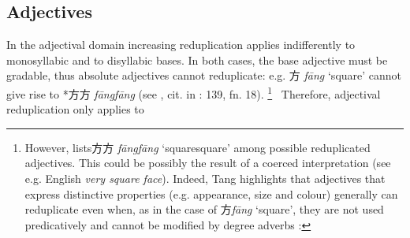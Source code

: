 \documentclass[output=paper]{langsci/langscibook}
\begin{document}
\subsection{Adjectives}

In the adjectival domain increasing reduplication applies indifferently
to monosyllabic and to disyllabic bases. In both cases, the base
adjective must be gradable, thus absolute adjectives cannot reduplicate:
e.g. 方 \emph{fāng} `square' cannot give rise to *\hspace*{-.1pt}方方
\emph{fāng\tld{}fāng} %
(see %
\citealt{Paris1979}%
, cit. in %
\citealt{Paul2010a}%
: 139, fn. 18).
%
%
%
\footnote{However, %
\citet[279-283]{Tang88} %
%
lists方方
  \emph{fāng\tld{}fāng}
  `square\emph{\tld{}}square' among possible reduplicated
  adjectives. This could be possibly the result of a coerced
  interpretation (see e.g. English  \emph{very square face}).
  Indeed, Tang highlights that adjectives that express distinctive
  properties (e.g. appearance, size and colour) generally can
  reduplicate even when, as in the case of 方\emph{fāng} `square', they
  are not used predicatively and cannot be modified by degree adverbs
\citep[examples from][283]{Tang88}%
%
:

\z


\z

\zlast
  }%
%
\ Therefore, adjectival reduplication only applies to
\end{document}
